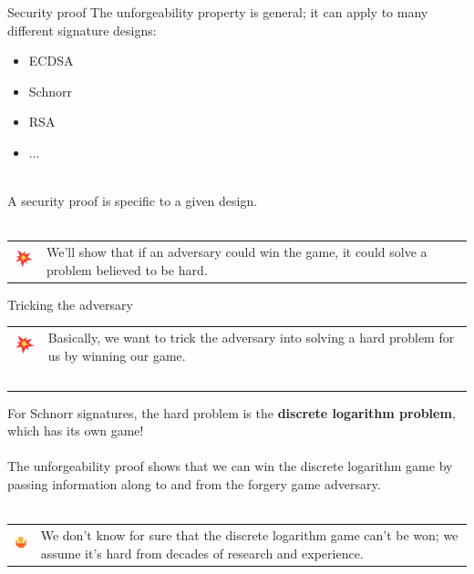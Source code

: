 \documentclass[aspectratio=169]{beamer}
\begin{document}
\begin{frame}{Security proof}
    The unforgeability property is general; it can apply to many different signature designs:
    \begin{itemize}
        \item ECDSA
        \item Schnorr
        \item RSA
        \item ... \\~\\
    \end{itemize}

    A security proof is specific to a given design. \\~\\

    \begin{tabular}{>{\arraybackslash}m{40px} >{\arraybackslash}m{320px}}
        \includegraphics[width=30px]{images/collision.png} & We'll show that if an adversary could win the game, it could solve a problem believed to be hard.
    \end{tabular}
\end{frame}

\begin{frame}{Tricking the adversary}
    \begin{tabular}{>{\arraybackslash}m{40px} >{\arraybackslash}m{320px}}
        \includegraphics[width=30px]{images/collision.png} & Basically, we want to trick the adversary into solving a hard problem for us by winning our game. \\~\\
    \end{tabular}

    For Schnorr signatures, the hard problem is the \textbf{discrete logarithm problem}, which has its own game! \\~\\

    The unforgeability proof shows that we can win the discrete logarithm game by passing information along to and from the forgery game adversary. \\~\\

    \begin{tabular}{>{\arraybackslash}m{40px} >{\arraybackslash}m{320px}}
        \includegraphics[width=30px]{images/shrug.png} & We don't know for sure that the discrete logarithm game can't be won; we assume it's hard from decades of research and experience.
    \end{tabular}
\end{frame}
\end{document}
